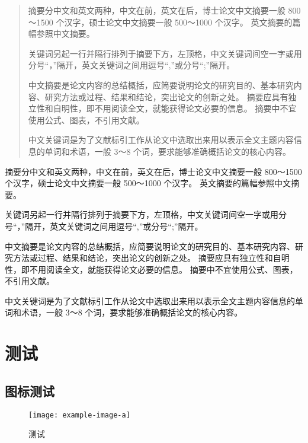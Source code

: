 \documentclass[library = {math.master}]{whuthesis}
\begin{document}
\frontmatter

\begin{abstract}
  摘要分中文和英文两种，中文在前，英文在后，博士论文中文摘要一般 800～1500 个汉字，硕士论文中文摘要一般 500～1000 个汉字。
  英文摘要的篇幅参照中文摘要。

  关键词另起一行并隔行排列于摘要下方，左顶格，中文关键词间空一字或用分号“，”隔开，英文关键词之间用逗号“,”或分号“;”隔开。

  中文摘要是论文内容的总结概括，应简要说明论文的研究目的、基本研究内容、研究方法或过程、结果和结论，突出论文的创新之处。
  摘要应具有独立性和自明性，即不用阅读全文，就能获得论文必要的信息。
  摘要中不宜使用公式、图表，不引用文献。

  中文关键词是为了文献标引工作从论文中选取出来用以表示全文主题内容信息的单词和术语，一般 3～8 个词，要求能够准确概括论文的核心内容。
\end{abstract}


\begin{abstract*}
  摘要分中文和英文两种，中文在前，英文在后，博士论文中文摘要一般 800～1500 个汉字，硕士论文中文摘要一般 500～1000 个汉字。
  英文摘要的篇幅参照中文摘要。

  关键词另起一行并隔行排列于摘要下方，左顶格，中文关键词间空一字或用分号“，”隔开，英文关键词之间用逗号“,”或分号“;”隔开。

  中文摘要是论文内容的总结概括，应简要说明论文的研究目的、基本研究内容、研究方法或过程、结果和结论，突出论文的创新之处。
  摘要应具有独立性和自明性，即不用阅读全文，就能获得论文必要的信息。
  摘要中不宜使用公式、图表，不引用文献。

  中文关键词是为了文献标引工作从论文中选取出来用以表示全文主题内容信息的单词和术语，一般 3～8 个词，要求能够准确概括论文的核心内容。
\end{abstract*}

\tableofcontents


\mainmatter

\chapter{测试}
\section{图标测试}

\begin{figure}[htbp]
  \centering
  \texttt{[image: example-image-a]}
  \caption{测试}
  \label{figure:test}
\end{figure}
\end{document}
